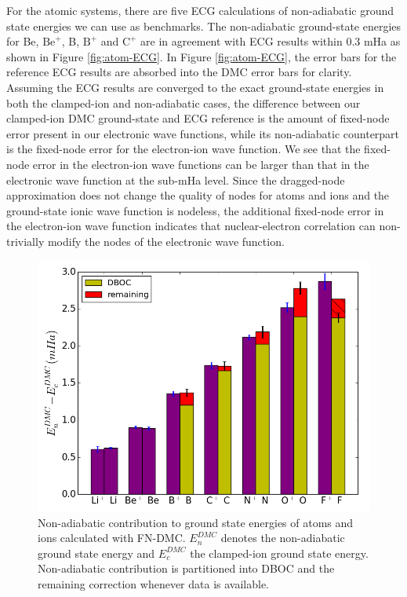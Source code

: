 \documentclass[pra,superscriptaddress,groupedaddress,twocolumn]{revtex4}
\begin{document}
For the atomic systems, there are five ECG calculations of non-adiabatic ground state energies we can use as benchmarks. The non-adiabatic ground-state energies for Be, $\text{Be}^+$, B, $\text{B}^+$ and $\text{C}^+$ are in agreement with ECG results within 0.3 mHa as shown in Figure \ref{fig:atom-ECG}. In Figure \ref{fig:atom-ECG}, the error bars for the reference ECG results are absorbed into the DMC error bars for clarity. Assuming the ECG results are converged to the exact ground-state energies in both the clamped-ion and non-adiabatic cases, the difference between our clamped-ion DMC ground-state and ECG reference is the amount of fixed-node error present in our electronic wave functions, while its non-adiabatic counterpart is the fixed-node error for the electron-ion wave function. We see that the fixed-node error in the electron-ion wave functions can be larger than that in the electronic wave function at the sub-mHa level. Since the dragged-node approximation does not change the quality of nodes for atoms and ions and the ground-state ionic wave function is nodeless, the additional fixed-node error in the electron-ion wave function indicates that nuclear-electron correlation can non-trivially modify the nodes of the electronic wave function.

\begin{figure}[h]
\includegraphics[scale=.37]{Figures/atom-nad-ad}
\caption{Non-adiabatic contribution to ground state energies of atoms and ions calculated with FN-DMC. $E_n^{DMC}$ denotes the non-adiabatic ground state energy and $E_c^{DMC}$ the clamped-ion ground state energy. Non-adiabatic contribution is partitioned into DBOC and the remaining correction whenever data is available. \label{fig:atom-nad-ad}} %
\end{figure}
\end{document}
